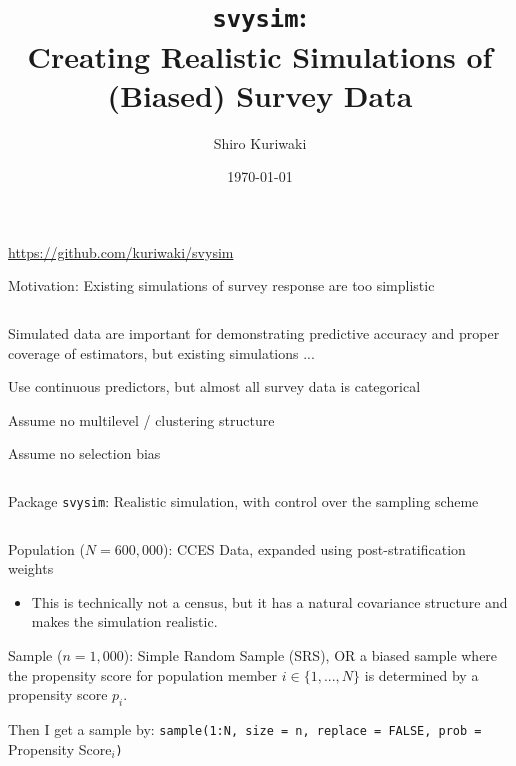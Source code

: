 \documentclass[ignorenonframetext, 10pt, aspectratio=169]{beamer}
\title{\textbf{\large{\texttt{svysim}:\\Creating Realistic Simulations of (Biased) Survey Data}}}
\author{Shiro Kuriwaki}
\date{\small\today}
\begin{document}
\begin{frame}
\centering
\maketitle
\url{https://github.com/kuriwaki/svysim}
\end{frame}

\begin{frame}
{Motivation: Existing simulations of survey response are too simplistic}


\begin{columns}
\begin{column}{0.7\linewidth}
Simulated data are important for demonstrating predictive accuracy and proper coverage of estimators, but existing simulations ...
\medskip
\begin{wideitemize}
\item Use continuous predictors, but almost all survey data is categorical
\item Assume no multilevel / clustering structure
\item Assume no selection bias
\end{wideitemize}

\bigskip
{}

\end{column}
\end{columns}

\end{frame}


\begin{frame}
{Package \texttt{svysim}: Realistic simulation, with control over the sampling scheme}

\begin{columns}
\begin{column}{0.7\linewidth}
\begin{wideitemize}
	\item Population ($N = 600,000$): CCES Data, expanded using post-stratification weights
	\begin{itemize}
	\item This is technically not a census, but it has a natural covariance structure and makes the simulation realistic.
	\end{itemize}
	\item Sample ($n = 1,000$): Simple Random Sample (SRS), OR a biased sample where the propensity score for population member \(i \in \{1, ..., N\}\) is determined by a propensity score \(p_i\).
	\item Then I get a sample by: \texttt{sample(1:N, size = n, replace = FALSE, prob =} Propensity Score$_i$\texttt{)}
\end{wideitemize}
\end{column}
\end{columns}


\end{frame}
\end{document}
